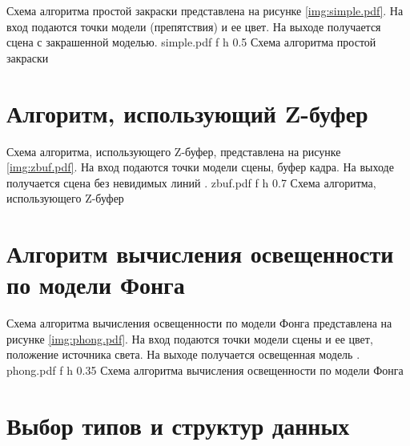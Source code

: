 Схема алгоритма простой закраски представлена на рисунке \ref{img:simple.pdf}.
На вход подаются точки модели (препятствия) и ее цвет.
На выходе получается сцена с закрашенной моделью.
	{simple.pdf}
	{f}
	{h}
	{0.5\textwidth}
	{Схема алгоритма простой закраски}
	
\section{Алгоритм, использующий Z-буфер}

Схема алгоритма, использующего Z-буфер, представлена на рисунке \ref{img:zbuf.pdf}.
На вход подаются точки модели сцены, буфер кадра.
На выходе получается сцена без невидимых линий \cite{baseInvisible}.
	{zbuf.pdf}
	{f}
	{h}
	{0.7\textwidth}
	{Схема алгоритма, использующего Z-буфер}
	
\clearpage

\section{Алгоритм вычисления освещенности по модели Фонга}

Схема алгоритма вычисления освещенности по модели Фонга представлена на рисунке \ref{img:phong.pdf}.
На вход подаются точки модели сцены и ее цвет, положение источника света.
На выходе получается освещенная модель \cite{baseLight}.
	{phong.pdf}
	{f}
	{h}
	{0.35\textwidth}
	{Схема алгоритма вычисления освещенности по модели Фонга}
	
\section{Выбор типов и структур данных}

